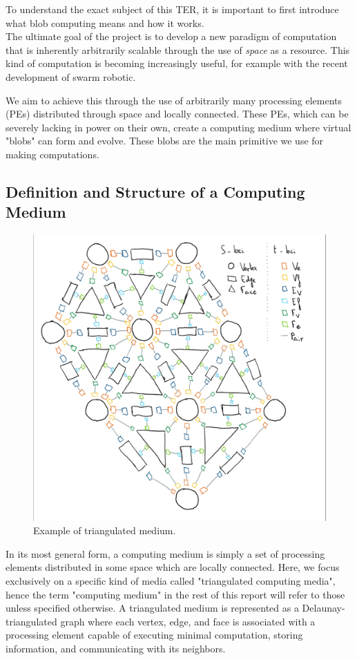 \documentclass{article}
\begin{document}
To understand the exact subject of this TER, it is important to first introduce what blob computing means and how it works.\\

The ultimate goal of the project is to develop a new paradigm of computation that is inherently arbitrarily scalable through the use of \textit{space} as a resource. This kind of computation is becoming increasingly useful, for example with the recent development of swarm robotic\supercite{swarm_robotic}.

We aim to achieve this through the use of arbitrarily many processing elements (PEs) distributed through space and locally connected. These PEs, which can be severely lacking in power on their own, create a computing medium where virtual "blobs" can form and evolve. These blobs are the main primitive we use for making computations.

\subsection{Definition and Structure of a Computing Medium}

\begin{figure}[h]
	\centering\includegraphics[width=0.9\linewidth]{assets/handdrawn_medium.png}
	\caption{Example of triangulated medium.}
	\label{fig:example_structure}
\end{figure}

In its most general form, a computing medium is simply a set of processing elements distributed in some space which are locally connected. Here, we focus exclusively on a specific kind of media called "triangulated computing media", hence the term "computing medium" in the rest of this report will refer to those unless specified otherwise. A triangulated medium is represented as a Delaunay-triangulated graph where each vertex, edge, and face is associated with a processing element capable of executing minimal computation, storing information, and communicating with its neighbors.
\end{document}

